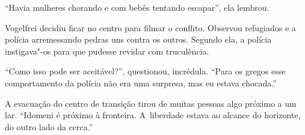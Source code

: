 ``Havia mulheres chorando e com bebês tentando escapar'', ela lembrou.

Vogelfrei decidiu ficar no centro para filmar o conflito. Observou
refugiados e a polícia arremessando pedras uns contra os outros. Segundo ela, a polícia instigava"-os para que pudesse revidar com truculência.

``Como isso pode ser aceitável?'', questionou, incrédula. ``Para os
gregos esse comportamento da polícia não era uma surpresa, mas eu estava
chocada.''

A evacuação do centro de transição tirou de muitas pessoas algo próximo
a um lar. ``Idomeni é próximo à fronteira. A~liberdade estava ao alcance
do horizonte, do outro lado da cerca.''
